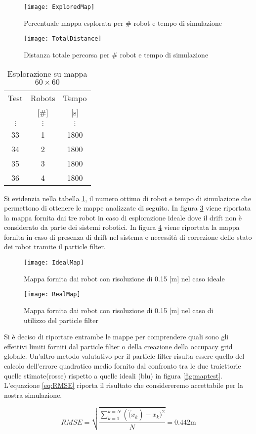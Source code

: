 \begin{figure}[htb]
	\centering
	\texttt{[image: ExploredMap]}
	\caption{Percentuale mappa esplorata per \# robot e tempo di simulazione}
	\label{fig:ExploredMap}
\end{figure}
%
\begin{figure}[htb]
	\centering
	\texttt{[image: TotalDistance]}
	\caption{Distanza totale percorsa per \# robot e tempo di simulazione}
	\label{fig:TotalDistance}
\end{figure}
\begin{table}[htb]
	\centering
	\caption{Esplorazione su mappa $60 \times 60$}
	\label{tab:optimalresults}
	\begin{tabular}{ccc}
	\toprule
	Test 		& 	Robots		&		Tempo\\
				&	[\#]			&		[\si{\second}]\\
	\midrule
								$\vdots$ & 	$\vdots$ & 	$\vdots$\\
      								33    &		1	 	& 1800\\
		 							34	& 		2 		& 1800\\
	\rowcolor[gray]{.9} 	35	& 		3 		& 1800\\
									36 	& 		4 		& 1800\\
     \bottomrule
\end{tabular}
\end{table}
%
\noindent 
Si evidenzia nella tabella \ref{tab:optimalresults}, il numero ottimo di robot 
e tempo di simulazione che permettono di ottenere le mappe analizzate di seguito.
In figura \ref{fig:IdealMap} viene riportata la mappa fornita dai tre robot in
caso di esplorazione ideale dove il drift non è considerato da parte dei sistemi
robotici.
In figura \ref{fig:RealMap} viene riportata la mappa fornita in caso di presenza
di drift nel sistema e necessità di correzione dello stato dei robot tramite il
particle filter.
\begin{figure}[htb]
	\centering
	\texttt{[image: IdealMap]}
	\caption{Mappa fornita dai robot con risoluzione di 0.15 [m] nel caso ideale}
\label{fig:IdealMap}
\end{figure}

\begin{figure}[!htb]
	\centering
	\texttt{[image: RealMap]}
	\caption{Mappa fornita dai robot con risoluzione di 0.15 [m] nel caso di utilizzo del particle filter }
\label{fig:RealMap}
\end{figure}

Si è deciso di riportare entrambe le mappe per comprendere quali sono gli effettivi 
limiti forniti dal particle filter o della creazione della occupacy grid globale.
Un'altro metodo valutativo per il particle filter risulta essere quello del
calcolo dell'errore quadratico medio fornito dal confronto tra le due traiettorie quelle
stimate(rosse) rispetto a quelle ideali (blu) in figura \ref{fig:maptest}. L'equazione \ref{eq:RMSE} riporta il risultato che considereremo accettabile per la nostra simulazione.

\begin{equation}
RMSE = \sqrt{ \frac{\sum_{k=1}^{k=N}(\hat(x_{k}) - x_{k})^2 }{N}} = 0.442 \si{\metre}
\label{eq:RMSE}
\end{equation}